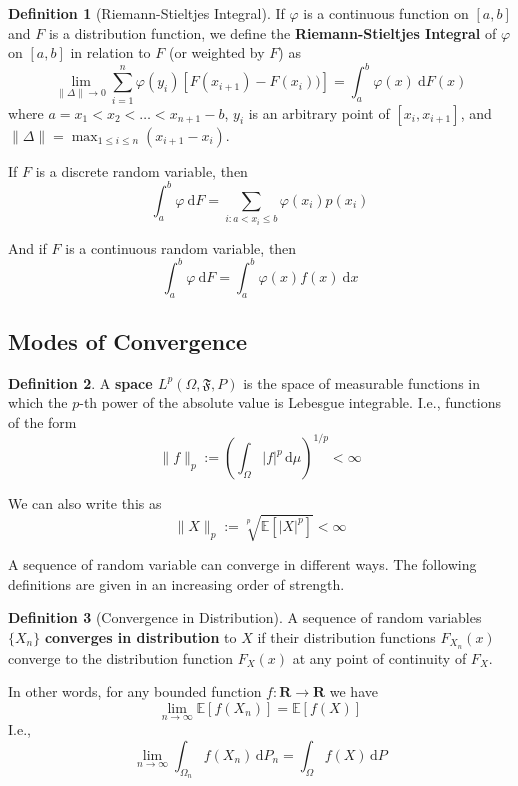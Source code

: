 \documentclass[12pt,a4paper]{article}
\theoremstyle{definition}
\newtheorem{definition}{Definition}[section]
\begin{document}
\begin{definition}[Riemann-Stieltjes Integral]
	If $\varphi$ is a continuous function on $[a,b]$ and $F$ is a distribution function, we define the \textbf{Riemann-Stieltjes Integral} of $\varphi$ on $[a,b]$ in relation to $F$ (or weighted by $F$) as
	\[
		\lim_{\| \Delta \| \to 0} \sum_{i=1}^n \varphi(y_i)[F(x_{i+1}) - F(x_i))] = \int_a^b \varphi(x) ~\mathrm{d}F(x)
	\]
	where $a = x_1 < x_2 < \ldots < x_{n+1} - b$, $y_i$ is an arbitrary point of $[x_i, x_{i+1}]$, and $\| \Delta \| = \max_{1 \leq i \leq n} (x_{i+1} - x_i)$.
\end{definition}

If $F$ is a discrete random variable, then
\[
	\int_a^b \varphi ~\mathrm{d}F = \sum_{i: a < x_i \leq b} \varphi(x_i) p(x_i)
\]

And if $F$ is a continuous random variable, then
\[
	\int_a^b \varphi ~\mathrm{d}F = \int_a^b \varphi(x) f(x) ~\mathrm{d}x
\]

\subsection{Modes of Convergence}

\begin{definition}
	A \textbf{space $L^p (\Omega, \mathfrak{F}, P)$} is the space of measurable functions in which the $p$-th power of the absolute value is Lebesgue integrable. I.e., functions of the form
	\[
		\| f \|_p := \left( \int_\Omega |f|^p \, \mathrm{d}\mu \right)^{1/p} < \infty
	\]

	We can also write this as
	\[
		\| X \|_p := \sqrt[p]{\mathbb{E}[|X|^p]} < \infty
	\]
\end{definition}

A sequence of random variable can converge in different ways. The following definitions are given in an increasing order of strength.

\begin{definition}[Convergence in Distribution]
	A sequence of random variables $\{ X_n \}$ \textbf{converges in distribution} to $X$ if their distribution functions $F_{X_n}(x)$ converge to the distribution function $F_X(x)$ at any point of continuity of $F_X$.
	
	In other words, for any bounded function $f : \textbf{R} \longrightarrow \textbf{R}$ we have
	\[
		\lim_{n \to \infty} \mathbb{E}[f(X_n)] = \mathbb{E}[f(X)]
	\]
	I.e.,
	\[
		\lim_{n \to \infty} \int_{\Omega_n} f(X_n) \, \mathrm{d}P_n = \int_{\Omega} f(X) \, \mathrm{d}P
	\]
\end{definition}
\end{document}

